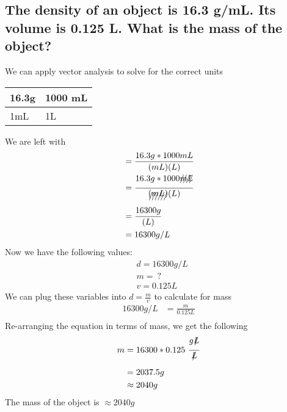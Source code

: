 \documentclass{scrartcl}
\begin{document}
\subsection{The density of an object is 16.3 g/mL. Its volume is 0.125 L. What is the mass of the object?}
\label{sec:org5714fb5}
We can apply vector analysis to solve for the correct units
\begin{center}
\begin{tabular}{ll}
\toprule
16.3g & 1000 mL\\
\midrule
1mL & 1L\\
\bottomrule
\end{tabular}
\end{center}
We are left with
\begin{align*}
&= \frac{16.3g * 1000mL}{(mL)(L)}\\
&= \frac{16.3g * 1000\xout{mL}}{\xout{(mL)}(L)}\\
&= \frac{16300g}{(L)}\\
&= 16300g/L
\end{align*}
Now we have the following values:
\begin{align*}
&d = 16300g/L\\
&m = \ ?\\
&v = 0.125L
\end{align*}
We can plug these variables into \(d=\frac{m}{v}\) to calculate for mass
\begin{align*}
16300{g}/{L} &=\frac{m}{0.125L}\\
\end{align*}
Re-arranging the equation in terms of mass, we get the following
\begin{align*}
m &= 16300 * 0.125\ \frac{g\xout{L}}{\xout{L}}\\
&= 2037.5g\\
&\approx 2040g
\end{align*}
The mass of the object is \(\approx 2040g\)
\end{document}
